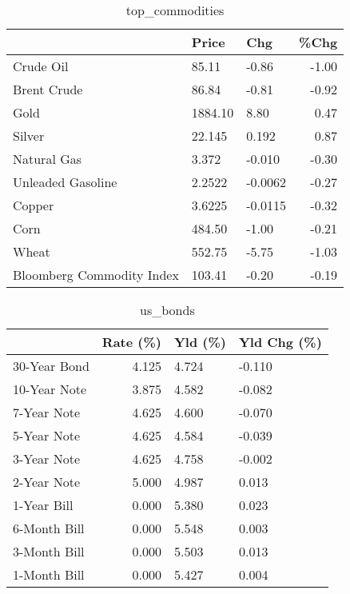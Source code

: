 \documentclass{article}%
\begin{document}
\begin{table}[htbp]%
\caption{top\_commodities}%
\centering%
\begin{adjustbox}{width=1\textwidth}%
\begin{tabular}{lllr}
\toprule
                          &   Price &     Chg &  \%Chg \\
\midrule
               Crude Oil  &   85.11 &   -0.86 & -1.00 \\
             Brent Crude  &   86.84 &   -0.81 & -0.92 \\
                    Gold  & 1884.10 &    8.80 &  0.47 \\
                  Silver  &  22.145 &   0.192 &  0.87 \\
             Natural Gas  &   3.372 &  -0.010 & -0.30 \\
       Unleaded Gasoline  &  2.2522 & -0.0062 & -0.27 \\
                  Copper  &  3.6225 & -0.0115 & -0.32 \\
                    Corn  &  484.50 &   -1.00 & -0.21 \\
                   Wheat  &  552.75 &   -5.75 & -1.03 \\
Bloomberg Commodity Index &  103.41 &   -0.20 & -0.19 \\
\bottomrule
\end{tabular}
%
\end{adjustbox}%
\end{table}

%


\begin{table}[htbp]%
\caption{us\_bonds}%
\centering%
\begin{adjustbox}{width=1\textwidth}%
\begin{tabular}{lrll}
\toprule
             &  Rate (\%) & Yld (\%) & Yld Chg (\%) \\
\midrule
30-Year Bond &     4.125 &   4.724 &      -0.110 \\
10-Year Note &     3.875 &   4.582 &      -0.082 \\
 7-Year Note &     4.625 &   4.600 &      -0.070 \\
 5-Year Note &     4.625 &   4.584 &      -0.039 \\
 3-Year Note &     4.625 &   4.758 &      -0.002 \\
 2-Year Note &     5.000 &   4.987 &       0.013 \\
 1-Year Bill &     0.000 &   5.380 &       0.023 \\
6-Month Bill &     0.000 &   5.548 &       0.003 \\
3-Month Bill &     0.000 &   5.503 &       0.013 \\
1-Month Bill &     0.000 &   5.427 &       0.004 \\
\bottomrule
\end{tabular}
%
\end{adjustbox}%
\end{table}
\end{document}
